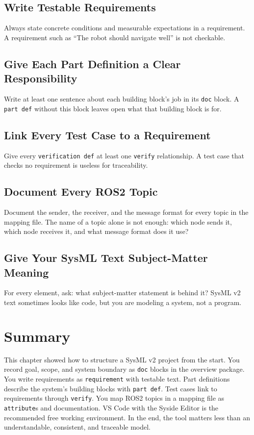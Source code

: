\subsection{Write Testable Requirements}
Always state concrete conditions and measurable expectations in a requirement. A requirement such as \enquote{The robot should navigate well} is not checkable.

\subsection{Give Each Part Definition a Clear Responsibility}
Write at least one sentence about each building block's job in its \texttt{doc} block. A \texttt{part def} without this block leaves open what that building block is for.

\subsection{Link Every Test Case to a Requirement}
Give every \texttt{verification def} at least one \texttt{verify} relationship. A test case that checks no requirement is useless for traceability.

\subsection{Document Every ROS2 Topic}
Document the sender, the receiver, and the message format for every topic in the mapping file. The name of a topic alone is not enough: which node sends it, which node receives it, and what message format does it use?

\subsection{Give Your SysML Text Subject-Matter Meaning}
For every element, ask: what subject-matter statement is behind it? SysML v2 text sometimes looks like code, but you are modeling a system, not a program.

\section{Summary}
This chapter showed how to structure a SysML v2 project from the start. You record goal, scope, and system boundary as \texttt{doc} blocks in the overview package. You write requirements as \texttt{requirement} with testable text. Part definitions describe the system's building blocks with \texttt{part def}. Test cases link to requirements through \texttt{verify}. You map ROS2 topics in a mapping file as \texttt{attribute}s and documentation. VS Code with the Syside Editor is the recommended free working environment. In the end, the tool matters less than an understandable, consistent, and traceable model.


